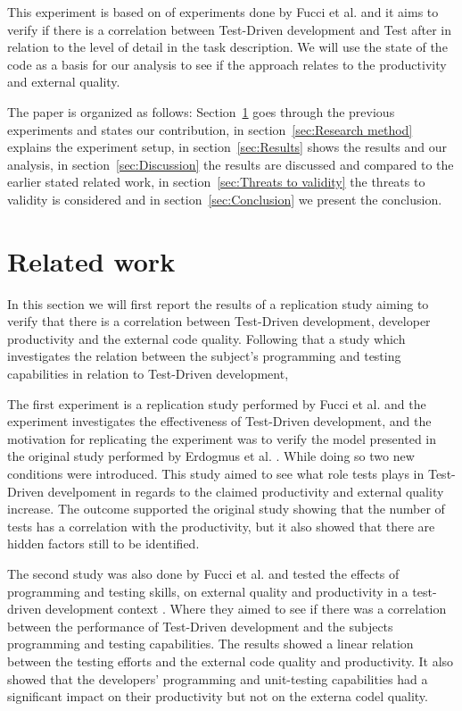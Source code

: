 \documentclass{sig-alternate-05-2015}
\begin{document}
This experiment is based on of experiments done by Fucci et al. \cite{fucci2} and it aims to verify if there is a correlation between Test-Driven development and Test after in relation to the level of detail in the task description. We will use the state of the code as a basis for our analysis to see if the approach relates to the productivity and external quality.


The paper is organized as follows: Section~\ref{sec:Related work} goes through the previous experiments and states our contribution, in section~\ref{sec:Research method} explains the experiment setup, in section~\ref{sec:Results} shows the results and our analysis, in section~\ref{sec:Discussion} the results are discussed and compared to the earlier stated related work, in section~\ref{sec:Threats to validity} the threats to validity is considered and in section~\ref{sec:Conclusion} we present the conclusion. 

\section{Related work}
\label{sec:Related work}
In this section we will first report the results of a replication study aiming to verify that there is a correlation between Test-Driven development, developer productivity and the external code quality. Following that a study which investigates the relation between the subject's programming and testing capabilities in relation to Test-Driven development,

The first experiment is a replication study performed by  Fucci et al. \cite{fucci2} and the experiment investigates the effectiveness of Test-Driven development, and the motivation for replicating the experiment was to verify the model presented in the original study performed by Erdogmus et al. \cite{erdogmus1}. While doing so two new conditions were introduced. This study aimed to see what role tests plays in Test-Driven develpoment in regards to the claimed productivity and external quality increase. The outcome supported the original study showing that the number of tests has a correlation with the productivity, but it also showed that there are hidden factors still to be identified.

The second study was also done by Fucci et al. and tested the effects of programming and testing skills, on external quality and productivity in a test-driven development context \cite{fucci1}. Where they aimed to see if there was a correlation between the performance of Test-Driven development and the subjects programming and testing capabilities. The results showed a linear relation between the testing efforts and the external code quality and productivity. It also showed that the developers' programming and unit-testing capabilities had a significant impact on their productivity but not on the externa codel quality.
\end{document}
